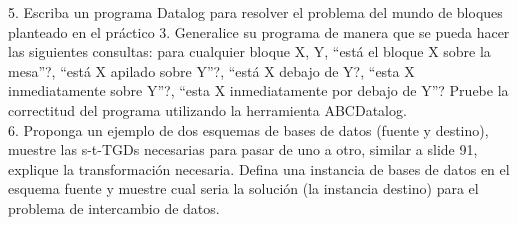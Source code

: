 5. Escriba un programa Datalog para resolver el problema del mundo de bloques planteado en el práctico 3. Generalice su programa de manera que se pueda hacer las siguientes consultas: para cualquier bloque X, Y, “está el bloque X sobre la mesa”?, “está X apilado sobre Y”?, “está X debajo de Y?, “esta X inmediatamente sobre Y”?, “esta X inmediatamente por debajo de Y”? Pruebe la correctitud del programa utilizando la herramienta ABCDatalog. \\

6. Proponga un ejemplo de dos esquemas de bases de datos (fuente y destino), muestre las s-t-TGDs necesarias para pasar de uno a otro, similar a slide 91, explique la transformación necesaria. Defina una instancia de bases de datos en el esquema fuente y muestre cual seria la solución (la instancia destino) para el problema de intercambio de datos. \\

\bigskip